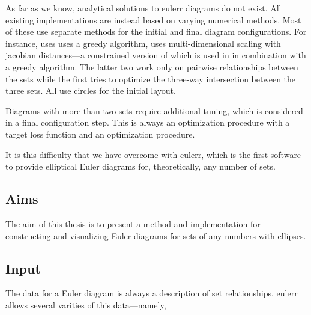 \documentclass[a4paper,nofonts,nobib,titlepage,justified,marginals=raggedouter,nohyper]{tufte-handout}\usepackage[]{graphicx}\usepackage[]{color}
\newcommand{\pkg}[1]{{\fontseries{b}\selectfont #1}}
\begin{document}
As far as we know, analytical solutions to eulerr diagrams do not exist. All
existing implementations are instead based on varying numerical methods.
Most of these use separate methods for the initial and final diagram
configurations. For instance, \citet{micallef_2013} uses uses a greedy
algorithm, \citet{wilkinson_2012} uses
multi-dimensional scaling with jacobian distances---a constrained version of
which is used in \citet{frederickson_2016} in combination with a greedy algorithm. The
latter two work only on pairwise relationships between the sets while the first
tries to optimize the three-way intersection between the three sets. All use
circles for the initial layout.

Diagrams with more than two sets require additional tuning, which is considered
in a final configuration step. This is always an optimization procedure with
a target loss function and an optimization procedure.

It is this difficulty that we have overcome with \pkg{eulerr}, which is the
first software to provide elliptical Euler diagrams for, theoretically, any
number of sets.

\subsection{Aims}

The aim of this thesis is to present a method and implementation for
constructing and visualizing Euler diagrams for sets of any numbers with
ellipses.

\subsection{Input}

The data for a Euler diagram is always
a description of set relationships. \pkg{eulerr} allows several varities of
this data---namely,
\end{document}
